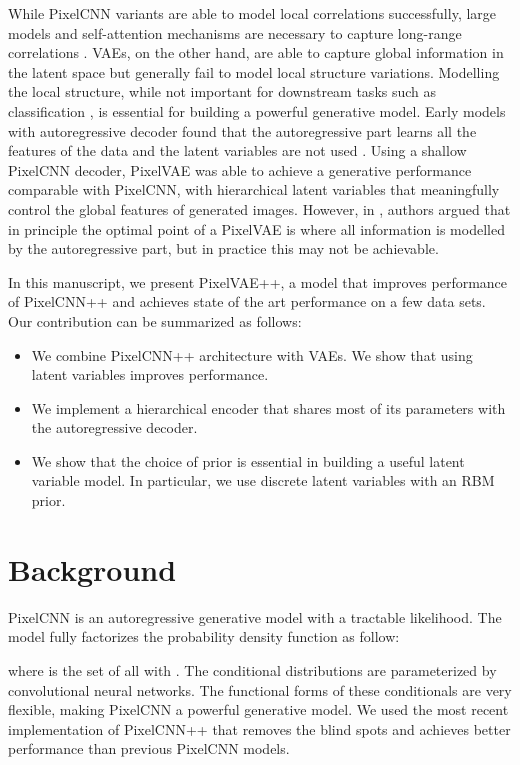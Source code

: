 \documentclass{article}
\begin{document}
While PixelCNN variants are able to model local correlations successfully, large models and self-attention mechanisms are necessary to capture long-range correlations \cite{chen2017pixelsnail}. VAEs, on the other hand, are able to capture global information in the latent space but generally fail to model local structure variations. Modelling the local structure, while not important for downstream tasks such as classification \cite{bengio2013deep}, is essential for building a powerful generative model. Early models with autoregressive decoder found that the autoregressive part learns all the features of the data and the latent variables are not used \cite{fabius2014variational, bowman2015generating, chung2014empirical, serban2016building, serban2017hierarchical, fraccaro2016sequential}. Using a shallow PixelCNN decoder, PixelVAE \cite{gulrajani2016pixelvae} was able to achieve a generative performance comparable with PixelCNN, with hierarchical latent variables that meaningfully control the global features of generated images. However, in \cite{chen2016variational}, authors argued that in principle the optimal point of a PixelVAE is where all information is modelled by the autoregressive part, but in practice this may not be achievable.

In this manuscript, we present PixelVAE++, a model that improves performance of PixelCNN++ and achieves state of the art performance on a few data sets.
Our contribution can be summarized as follows:
\begin{itemize}
    \item We combine PixelCNN++ architecture with VAEs. We show that using latent variables improves performance.
    \item We implement a hierarchical encoder that shares most of its parameters with the autoregressive decoder.
    \item We show that the choice of prior is essential in building a useful latent variable model. In particular, we use discrete latent variables with an RBM prior.
\end{itemize}


\section{Background}
PixelCNN \cite{van2016conditional} is an autoregressive generative model with a tractable likelihood. The model fully factorizes the probability density function as follow: 
 
where  is the set of all  with .
The conditional distributions  are parameterized by convolutional neural networks. The functional forms of these conditionals are very flexible, making PixelCNN a powerful generative model. We used the most recent implementation of PixelCNN++ \cite{salimans2017pixelcnn++} that removes the blind spots and achieves better performance than previous PixelCNN models.
\end{document}
